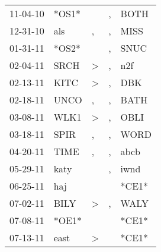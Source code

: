 \begin{supertabular}{p{0.07\textwidth}p{0.06\textwidth}p{0.02\textwidth}p{0.02\textwidth}p{0.06\textwidth}}
          11-04-10\textsuperscript{} &                            *OS1* &                  &                , &           BOTH\textsuperscript{} \\
          12-31-10\textsuperscript{} &            als\textsuperscript{} &                , &                , &           MISS\textsuperscript{} \\
          01-31-11\textsuperscript{} &                            *OS2* &                  &                , &           SNUC\textsuperscript{} \\
          02-04-11\textsuperscript{} &           SRCH\textsuperscript{} &     \textgreater &                , &            n2f\textsuperscript{} \\
          02-13-11\textsuperscript{} &           KITC\textsuperscript{} &     \textgreater &                , &            DBK\textsuperscript{} \\
          02-18-11\textsuperscript{} &           UNCO\textsuperscript{} &                , &                , &           BATH\textsuperscript{} \\
          03-08-11\textsuperscript{} &           WLK1\textsuperscript{} &     \textgreater &                , &           OBLI\textsuperscript{} \\
          03-18-11\textsuperscript{} &           SPIR\textsuperscript{} &                , &                , &           WORD\textsuperscript{} \\
          04-20-11\textsuperscript{} &           TIME\textsuperscript{} &                , &                , &           abcb\textsuperscript{} \\
          05-29-11\textsuperscript{} &           katy\textsuperscript{} &                  &                , &           iwnd\textsuperscript{} \\
          06-25-11\textsuperscript{} &            haj\textsuperscript{} &                  &                  &                            *CE1* \\
          07-02-11\textsuperscript{} &           BILY\textsuperscript{} &     \textgreater &                , &           WALY\textsuperscript{} \\
          07-08-11\textsuperscript{} &                            *OE1* &                  &                  &                            *CE1* \\
          07-13-11\textsuperscript{} &           east\textsuperscript{} &     \textgreater &                  &                            *CE1* \\

\end{supertabular}
